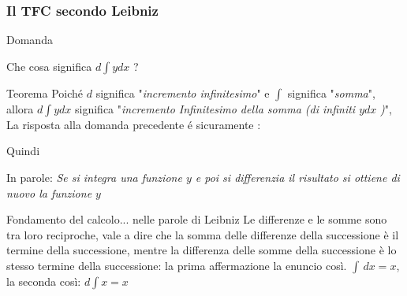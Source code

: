 \begin{frame}
    \frametitle{Il TFC secondo Leibniz}
    \begin{alertblock}{Domanda}
    \begin{center}
        \fontsize{15}{17.2}\selectfont
        Che cosa significa $d$$\int$$ydx$ ?
    \end{center}
    \end{alertblock}
    \begin{block}{Teorema}
        Poiché $d$ significa "\textit{incremento infinitesimo}" e $\int$
        significa "\textit{somma}", allora $d$$\int$$ydx$ significa
        "\textit{incremento Infinitesimo della somma (di infiniti $ydx$} \textit{)}",
        La risposta alla domanda precedente é sicuramente :
        \begin{center}
        \scalebox{2}{%
                    $d$$\int$$ydx = ydx$%
                    }
        \end{center}
        Quindi
        \begin{center}
        \end{center}
        In parole: \textit{Se si integra una funzione $y$ e poi si 
        differenzia il risultato si ottiene di nuovo la funzione $y$
        }
    \end{block}

    \begin{block}{Fondamento del calcolo... nelle parole di Leibniz\cite{Mugnai}}
        Le differenze e le somme sono tra loro reciproche, vale a dire che la somma delle differenze
        della successione è il termine della successione, mentre la differenza delle somme della successione
        è lo stesso termine della successione: la prima affermazione la enuncio così. $\int \,dx = x$,
        la seconda così: $d \int x = x$ 
    \end{block}
\end{frame}